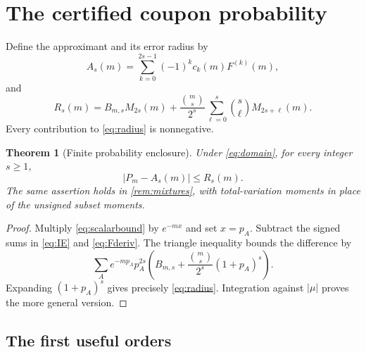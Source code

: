 \documentclass[11pt,a4paper]{article}
\newtheorem{theorem}{Theorem}[section]
\theoremstyle{definition}
\begin{document}
\section{The certified coupon probability}\label{sec:certificate}

Define the approximant and its error radius by
\begin{equation}\label{eq:approx}
 A_s(m)=\sum_{k=0}^{2s-1}(-1)^k c_k(m)F^{(k)}(m),
\end{equation}
and
\begin{equation}\label{eq:radius}
 \boxed{\quad
 R_s(m)=B_{m,s}M_{2s}(m)
 +\frac{\binom ms}{2^s}
     \sum_{\ell=0}^s\binom s\ell M_{2s+\ell}(m).
 \quad}
\end{equation}
Every contribution to \eqref{eq:radius} is nonnegative.

\begin{theorem}[Finite probability enclosure]\label{thm:coupon}
Under \eqref{eq:domain}, for every integer $s\ge1$,
\begin{equation}\label{eq:certtheorem}
 |P_m-A_s(m)|\le R_s(m).
\end{equation}
The same assertion holds in \cref{rem:mixtures}, with total-variation
moments in place of the unsigned subset moments.
\end{theorem}
\begin{proof}
Multiply \eqref{eq:scalarbound} by $e^{-mx}$ and set $x=p_A$.
Subtract the signed sums in \eqref{eq:IE} and \eqref{eq:Fderiv}.
The triangle inequality bounds the difference by
\[
 \sum_A e^{-mp_A}p_A^{2s}
 \left(B_{m,s}+\frac{\binom ms}{2^s}(1+p_A)^s\right).
\]
Expanding $(1+p_A)^s$ gives precisely \eqref{eq:radius}. Integration
against $|\mu|$ proves the more general version.
\end{proof}

\subsection{The first useful orders}
\end{document}
